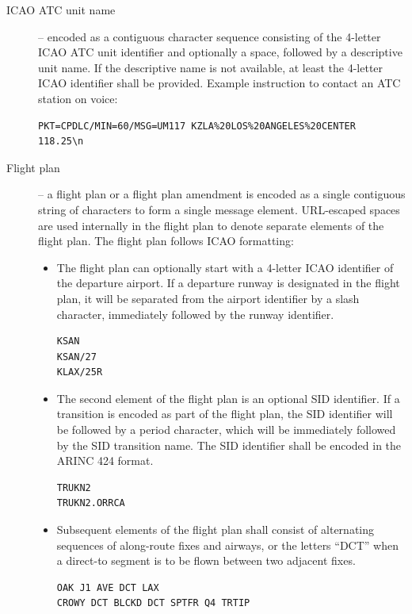 \documentclass[a4paper,12pt]{article}
\begin{document}
\begin{description}
\item[ICAO ATC unit name] -- encoded as a contiguous character sequence
consisting of the 4-letter ICAO ATC unit identifier and optionally a
space, followed by a descriptive unit name. If the descriptive name is
not available, at least the 4-letter ICAO identifier shall be provided.
Example instruction to contact an ATC station on voice:

\begin{verbatim}
PKT=CPDLC/MIN=60/MSG=UM117 KZLA%20LOS%20ANGELES%20CENTER 118.25\n
\end{verbatim}

\item[Flight plan] -- a flight plan or a flight plan amendment is encoded
as a single contiguous string of characters to form a single message
element. URL-escaped spaces are used internally in the flight plan to
denote separate elements of the flight plan. The flight plan follows ICAO
formatting:

\begin{itemize}

\item The flight plan can optionally start with a 4-letter ICAO
identifier of the departure airport. If a departure runway is designated
in the flight plan, it will be separated from the airport identifier by a
slash character, immediately followed by the runway identifier.

\begin{verbatim}
KSAN
KSAN/27
KLAX/25R
\end{verbatim}

\item The second element of the flight plan is an optional SID
identifier. If a transition is encoded as part of the flight plan, the
SID identifier will be followed by a period character, which will be
immediately followed by the SID transition name. The SID identifier shall
be encoded in the ARINC 424 format.

\begin{verbatim}
TRUKN2
TRUKN2.ORRCA
\end{verbatim}

\item Subsequent elements of the flight plan shall consist of alternating
sequences of along-route fixes and airways, or the letters ``DCT'' when a
direct-to segment is to be flown between two adjacent fixes.

\begin{verbatim}
OAK J1 AVE DCT LAX
CROWY DCT BLCKD DCT SPTFR Q4 TRTIP
\end{verbatim}


\end{itemize}
\end{description}
\end{document}
